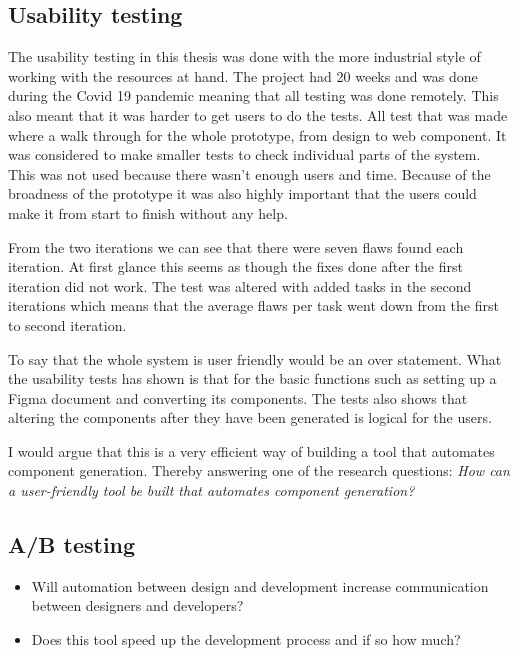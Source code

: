 \subsection{Usability testing}%
\label{sub:Usability testing}
The usability testing in this thesis was done with the more industrial style of working with the resources at hand. The project had 20 weeks and was done during the Covid 19 pandemic meaning that all testing was done remotely. This also meant that it was harder to get users to do the tests. All test that was made where a walk through for the whole prototype, from design to web component. It was considered to make smaller tests to check individual parts of the system. This was not used because there wasn't enough users and time. Because of the broadness of the prototype it was also highly important that the users could make it from start to finish without any help. 

From the two iterations we can see that there were seven flaws found each iteration. At first glance this seems as though the fixes done after the first iteration did not work. The test was altered with added tasks in the second iterations which means that the average flaws per task went down from the first to second iteration. 

To say that the whole system is user friendly would be an over statement. What the usability tests has shown is that for the basic functions such as setting up a Figma document and converting its components. The tests also shows that altering the components after they have been generated is logical for the users. 

I would argue that this is a very efficient way of building a tool that automates component generation. Thereby answering one of the research questions: \textit{How can a user-friendly tool be built that automates component generation?}

\subsection{A/B testing}%
\label{sub:A/B testing}


\begin{itemize}
 \item Will automation between design and development increase communication between designers and developers?
  \item Does this tool speed up the development process and if so how much?
\end{itemize}

